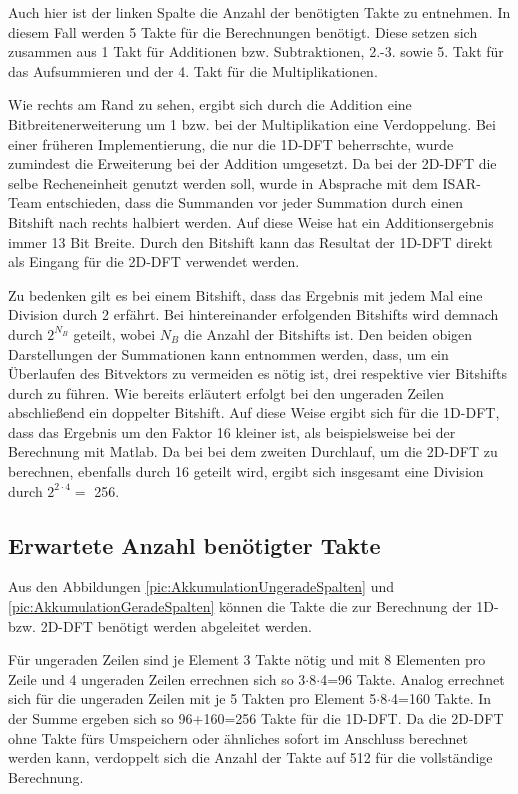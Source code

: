 \vspace{1cm}
Auch hier ist der linken Spalte die Anzahl der benötigten Takte zu entnehmen. In diesem Fall werden 5 Takte für die Berechnungen benötigt. Diese setzen sich zusammen aus
1 Takt für Additionen bzw. Subtraktionen, 2.-3. sowie 5. Takt für das Aufsummieren und der 4. Takt für die Multiplikationen.

Wie rechts am Rand zu sehen, ergibt sich durch die Addition eine Bitbreitenerweiterung um 1 bzw. bei der Multiplikation eine Verdoppelung. Bei einer früheren 
Implementierung, die nur die 1D-DFT beherrschte, wurde zumindest die Erweiterung bei der Addition umgesetzt. Da bei der 2D-DFT die selbe Recheneinheit genutzt 
werden soll, wurde in Absprache mit dem ISAR-Team entschieden, dass die Summanden vor jeder Summation durch einen Bitshift nach rechts halbiert werden. Auf diese
Weise hat ein Additionsergebnis immer 13 Bit Breite. Durch den Bitshift kann das Resultat der 1D-DFT direkt als Eingang für die 2D-DFT verwendet werden. 

Zu bedenken gilt es bei einem Bitshift, dass das Ergebnis mit jedem Mal eine Division durch 2 erfährt. Bei hintereinander erfolgenden Bitshifts wird demnach durch $2^{N_B}$ geteilt, 
wobei $N_B$ die Anzahl der Bitshifts ist. Den beiden obigen Darstellungen der Summationen kann entnommen werden, dass, um ein Überlaufen des Bitvektors zu vermeiden es nötig ist,
drei respektive vier Bitshifts durch zu führen. Wie bereits erläutert erfolgt bei den ungeraden Zeilen abschließend ein doppelter Bitshift. Auf diese Weise ergibt sich für die
1D-DFT, dass das Ergebnis um den Faktor 16 kleiner ist, als beispielsweise bei der Berechnung mit Matlab. Da bei bei dem zweiten Durchlauf, um die 2D-DFT zu berechnen, ebenfalls 
durch 16 geteilt wird, ergibt sich insgesamt eine Division durch $2^{2\cdot4} = $ 256.

\subsection{Erwartete Anzahl benötigter Takte}
Aus den Abbildungen \ref{pic:AkkumulationUngeradeSpalten} und \ref{pic:AkkumulationGeradeSpalten} können die Takte die zur Berechnung der 1D- bzw. 2D-DFT benötigt werden 
abgeleitet werden.

Für ungeraden Zeilen sind je Element 3 Takte nötig und mit 8 Elementen pro Zeile und 4 ungeraden Zeilen errechnen sich so 3$\cdot$8$\cdot$4=96 Takte.
Analog errechnet sich für die ungeraden Zeilen mit je 5 Takten pro Element 5$\cdot$8$\cdot$4=160 Takte.
In der Summe ergeben sich so 96+160=256 Takte für die 1D-DFT. Da die 2D-DFT ohne Takte fürs Umspeichern oder ähnliches sofort im Anschluss berechnet werden kann, 
verdoppelt sich die Anzahl der Takte auf 512 für die vollständige Berechnung.



